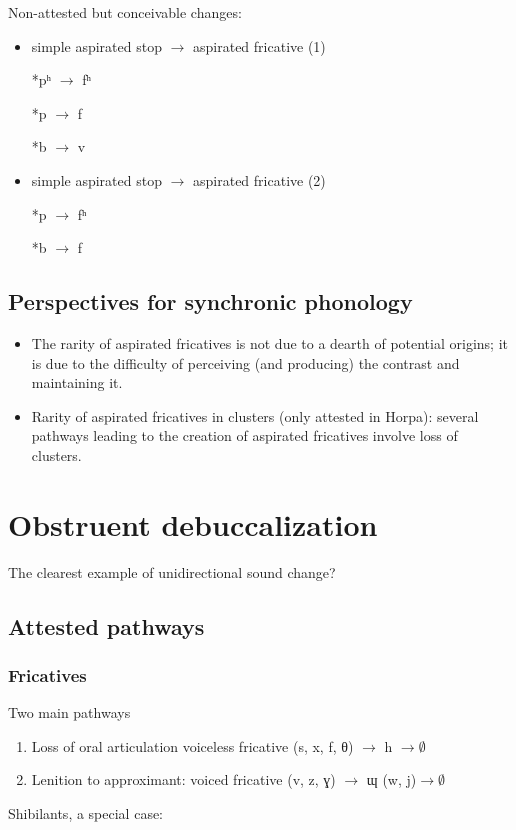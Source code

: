 \documentclass[oldfontcommands,oneside,a4paper,11pt]{article}
\begin{document}
Non-attested but conceivable changes:
\begin{itemize}
\item  simple aspirated stop $\rightarrow$ aspirated fricative (1)

  *pʰ $\rightarrow$ fʰ
  
  *p $\rightarrow$ f
  
  *b $\rightarrow$ v
 

\item simple aspirated stop $\rightarrow$ aspirated fricative (2)

  *p $\rightarrow$ fʰ
  
  *b $\rightarrow$ f
 
\end{itemize} 
\subsection{Perspectives for synchronic phonology}
\begin{itemize}
\item     The rarity of aspirated fricatives is not due to a dearth of potential origins; it is due to the difficulty of perceiving (and producing) the contrast and maintaining it.
\item  Rarity of aspirated fricatives in clusters (only attested in Horpa): several pathways leading to the creation of aspirated fricatives involve loss of clusters.
 
\end{itemize} 

\section{Obstruent debuccalization}
The clearest example of unidirectional sound change?
\subsection{Attested pathways}

  \subsubsection{Fricatives}
Two main pathways
\begin{enumerate}

 
\item Loss of oral articulation
  voiceless fricative (s, x, f, θ) $\rightarrow$ h $\rightarrow \emptyset$ 
 

\item Lenition to approximant:
  voiced fricative (v, z, ɣ) $\rightarrow$ ɰ (w, j)$\rightarrow \emptyset$ 
 

 
\end{enumerate}
  Shibilants, a special case:
\end{document}
